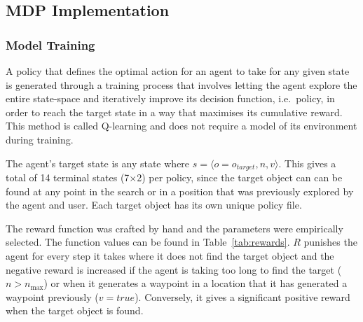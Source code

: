 \documentclass[a4paper, twoside]{article}
\begin{document}


\subsection{MDP Implementation}

\subsubsection{Model Training}

\noindent A policy that defines the optimal action for an agent to take for any given state is generated through a training process that involves letting the agent explore the entire state-space and iteratively improve its decision function, i.e.\ policy, in order to reach the target state in a way that maximises its cumulative reward. This method is called Q-learning and does not require a model of its environment during training. 

The agent's target state is any state where $s = \langle{}o=o_{target}, n, v\rangle$. This gives a total of 14 terminal states (7$\times$2) per policy, since the target object can can be found at any point in the search or in a position that was previously explored by the agent and user. Each target object has its own unique policy file.

The reward function was crafted by hand and the parameters were empirically selected. The function values can be found in Table~\ref{tab:rewards}. $R$ punishes the agent for every step it takes where it does not find the target object and the negative reward is increased if the agent is taking too long to find the target ($n > n_{\max}$) or when it generates a waypoint in a location that it has generated a waypoint previously ($v = true$). Conversely, it gives a significant positive reward when the target object is found. 
\end{document}
